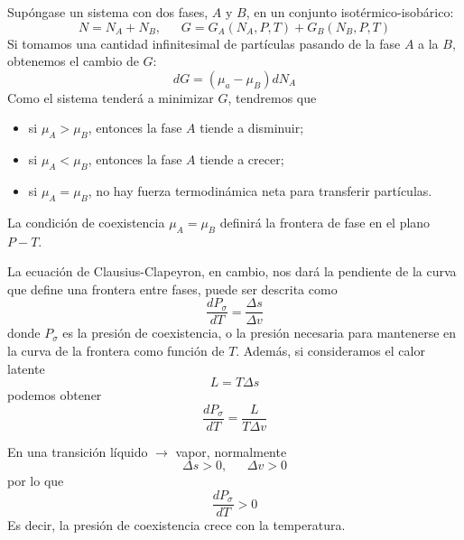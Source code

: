 \documentclass[]{article}
\numberwithin{equation}{section}
\newcommand{\0}{\textcolor{gray}{0}}
\newcommand{\td}[2]{\dfrac{d #1}{d #2}}
\begin{document}
Supóngase un sistema con dos fases, \(A\) y \(B\), en un conjunto isotérmico-isobárico:
\begin{equation*}
	N = N_A + N_B, ~~~~~~~ G = G_A(N_A,P,T) + G_B(N_B,P,T)
\end{equation*}
Si tomamos una cantidad infinitesimal de partículas pasando de la fase \(A\) a la \(B\), obtenemos el cambio de \(G\):
\begin{equation}
	dG = (\mu_a - \mu_B) dN_A
\end{equation}
Como el sistema tenderá a minimizar \(G\), tendremos que
\begin{itemize}
	\item si \(\mu_A > \mu_B\), entonces la fase \(A\) tiende a disminuir;
	\item si \(\mu_A < \mu_B\), entonces la fase \(A\) tiende a crecer;
	\item si \(\mu_A = \mu_B\), no hay fuerza termodinámica neta para transferir partículas.
\end{itemize}
La condición de coexistencia \(\mu_A = \mu_B\) definirá la frontera de fase en el plano \(P-T \). 

La ecuación de Clausius-Clapeyron, en cambio, nos dará la pendiente de la curva que define una frontera entre fases, puede ser descrita como
\begin{equation}
	\td{P_\sigma}{T} = \frac{\Delta s}{\Delta v}
\end{equation}
donde \(P_\sigma\) es la presión de coexistencia, o la presión necesaria para mantenerse en la curva de la frontera como función de \(T\). Además, si consideramos el calor latente
\begin{equation}
	L = T \Delta s
\end{equation}
podemos obtener
\begin{equation}
	\td{P_\sigma}{T} = \frac{L}{T \Delta v}
\end{equation}

En una transición líquido \(\rightarrow\) vapor, normalmente
\begin{equation*}
	\Delta s > 0, ~~~~~~~ \Delta v > 0
\end{equation*}
por lo que
\begin{equation*}
	\td{P_\sigma}{T} > 0
\end{equation*}
Es decir, la presión de coexistencia crece con la temperatura.
\end{document}
